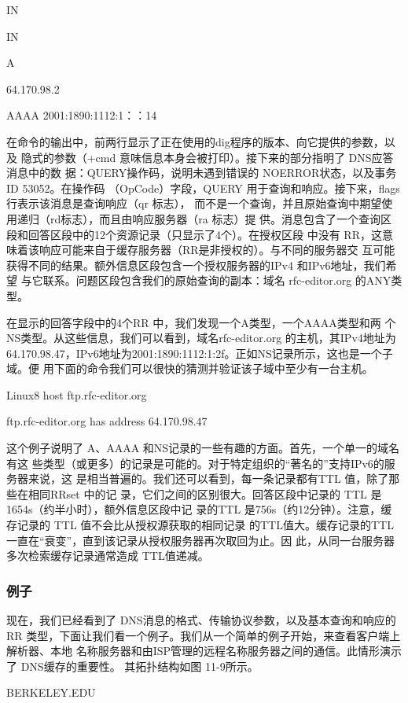 IN

IN

A

64.170.98.2

AAAA 2001:1890:1112:1：：14

在命令的输出中，前两行显示了正在使用的dig程序的版本、向它提供的参数，以及
隐式的参数（+cmd 意味信息本身会被打印）。接下来的部分指明了 DNS应答消息中的数
据：QUERY操作码，说明未遇到错误的 NOERROR状态，以及事务 ID 53052。在操作码
（OpCode）字段，QUERY 用于查询和响应。接下来，flags 行表示该消息是查询响应（qr 标志），
而不是一个查询，并且原始查询中期望使用递归（rd标志），而且由响应服务器（ra 标志）提
供。消息包含了一个查询区段和回答区段中的12个资源记录（只显示了4个）。在授权区段
中没有 RR，这意味着该响应可能来自于缓存服务器（RR是非授权的）。与不同的服务器交
互可能获得不同的结果。额外信息区段包含一个授权服务器的IPv4 和IPv6地址，我们希望
与它联系。问题区段包含我们的原始查询的副本：域名 rfc-editor.org 的ANY类型。

在显示的回答字段中的4个RR 中，我们发现一个A类型，一个AAAA类型和两
个NS类型。从这些信息，我们可以看到，域名rfc-editor.org 的主机，其IPv4地址为
64.170.98.47，IPv6地址为2001:1890:1112:1:2f。正如NS记录所示，这也是一个子域。便
用下面的命令我们可以很快的猜测并验证该子域中至少有一台主机。

Linux8 host ftp.rfc-editor.org

ftp.rfc-editor.org has address 64.170.98.47

这个例子说明了 A、AAAA 和NS记录的一些有趣的方面。首先，一个单一的域名有这
些类型（或更多）的记录是可能的。对于特定组织的“著名的”支持IPv6的服务器来说，这
是相当普遍的。我们还可以看到，每一条记录都有TTL 值，除了那些在相同RRset 中的记
录，它们之间的区别很大。回答区段中记录的 TTL 是1654s（约半小时），额外信息区段中记
录的TTL 是756s（约12分钟）。注意，缓存记录的 TTL 值不会比从授权源获取的相同记录
的TTL值大。缓存记录的TTL 一直在“衰变”，直到该记录从授权服务器再次取回为止。因
此，从同一台服务器多次检索缓存记录通常造成 TTL值递减。

\subsubsection{例子}

现在，我们已经看到了 DNS消息的格式、传输协议参数，以及基本查询和响应的RR
类型，下面让我们看一个例子。我们从一个简单的例子开始，来查看客户端上解析器、本地
名称服务器和由ISP管理的远程名称服务器之间的通信。此情形演示了 DNS缓存的重要性。
其拓扑结构如图 11-9所示。

BERKELEY.EDU

